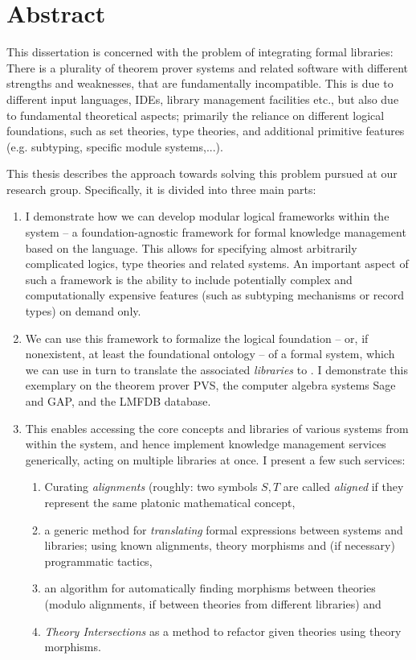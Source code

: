 \section*{Abstract}

This dissertation is concerned with the problem of integrating formal libraries: There is a plurality of theorem prover systems and related software with different strengths and weaknesses, that are fundamentally incompatible. This is due to different input languages, IDEs, library management facilities etc., but also due to fundamental theoretical aspects; primarily the reliance on different logical foundations, such as set theories, type theories, and additional primitive features (e.g. subtyping, specific module systems,...).

This thesis describes the approach towards solving this problem pursued at our research group. Specifically, it is divided into three main parts:
\begin{enumerate}
	\item I demonstrate how we can develop modular logical frameworks within the \mmt system -- a foundation-agnostic framework for formal knowledge management based on the \ommt language. This allows for specifying almost arbitrarily complicated logics, type theories and related systems. An important aspect of such a framework is the ability to include potentially complex and computationally expensive features (such as subtyping mechanisms or record types) on demand only.
	\item We can use this framework to formalize the logical foundation -- or, if nonexistent, at least the foundational ontology -- of a formal system, which we can use in turn to translate the associated \emph{libraries} to \ommt. I demonstrate this exemplary on the theorem prover PVS, the computer algebra systems Sage and GAP, and the LMFDB database.
	\item This enables accessing the core concepts and libraries of various systems from within the \mmt system, and hence implement knowledge management services generically, acting on multiple libraries at once. I present a few such services:
	\begin{enumerate}
		\item Curating \emph{alignments} (roughly: two symbols $S, T$ are called \emph{aligned} if they represent the same platonic mathematical concept,
		\item a generic method for \emph{translating} formal expressions between systems and libraries; using known alignments, theory morphisms and (if necessary) programmatic tactics,
		\item an algorithm for automatically finding morphisms between theories (modulo alignments, if between theories from different libraries) and
		\item \emph{Theory Intersections} as a method to refactor given theories using theory morphisms.
	\end{enumerate}
\end{enumerate}

